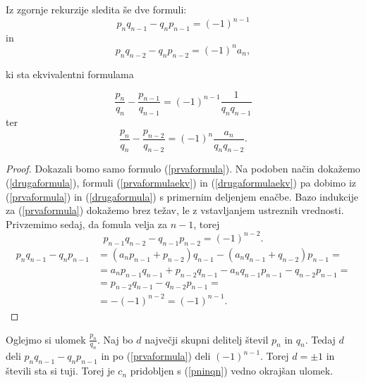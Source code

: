 \documentclass[a4paper,12pt]{article}
\theoremstyle{definition}
\theoremstyle{proposition}
\theoremstyle{theorem}
\theoremstyle{lemma}
\begin{document}
\vspace{5mm}

Iz zgornje rekurzije sledita še dve formuli:
\begin{equation}
\label{prvaformula}
p_n q_{n-1} - q_n p_{n-1} = (-1)^{n-1}
\end{equation}
in
\begin{equation}
\label{drugaformula}
p_n q_{n-2} - q_n p_{n-2} = (-1)^n a_n,
\end{equation}

ki sta ekvivalentni formulama

\begin{equation}
\label{prvaformulaekv}
\frac{p_n}{q_n} - \frac{p_{n-1}}{q_{n-1}} = (-1)^{n-1}\frac{1}{q_n q_{n-1}}
\end{equation}
ter
\begin{equation}
\label{drugaformulaekv}
\frac{p_n}{q_n} - \frac{p_{n-2}}{q_{n-2}} = (-1)^{n}\frac{a_n}{q_n q_{n-2}}.
\end{equation}

\begin{proof}
Dokazali bomo samo formulo (\ref{prvaformula}). Na podoben način dokažemo (\ref{drugaformula}), formuli (\ref{prvaformulaekv}) in (\ref{drugaformulaekv}) pa dobimo iz (\ref{prvaformula}) in (\ref{drugaformula}) s primernim deljenjem enačbe.
Bazo indukcije za (\ref{prvaformula}) dokažemo brez težav, le z vstavljanjem ustreznih vrednosti. Privzemimo sedaj, da fomula velja za $n-1$, torej 
\[ p_{n-1} q_{n-2} - q_{n-1} p_{n-2} = (-1)^{n-2}. \]
\begin{equation*}
\begin{split}
p_n q_{n-1} - q_n p_{n-1} &= (a_{n}p_{n-1} + p_{n-2}) q_{n-1} - (a_{n}q_{n-1} + q_{n-2}) p_{n-1} = \\
&= a_{n}p_{n-1}q_{n-1} + p_{n-2} q_{n-1} - a_{n}q_{n-1}p_{n-1} - q_{n-2} p_{n-1} = \\
&= p_{n-2} q_{n-1} - q_{n-2} p_{n-1} = \\
&= -(-1)^{n-2} = (-1)^{n-1}.
\end{split}
\end{equation*}
\end{proof}

Oglejmo si ulomek $\frac{p_n}{q_n}$. Naj bo $d$ največji skupni delitelj števil $p_n$ in $q_n$. Tedaj $d$ deli $p_n q_{n-1} - q_n p_{n-1}$ in po (\ref{prvaformula}) deli $(-1)^{n-1}$. Torej $d= \pm 1$ in števili sta si tuji. Torej je $c_n$  pridobljen s (\ref{pninqn}) vedno okrajšan ulomek.\\
\end{document}
